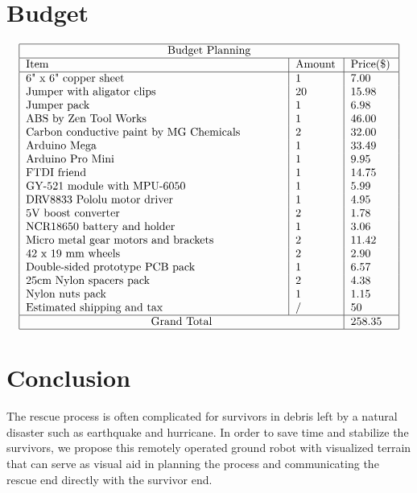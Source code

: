 \documentclass[a4paper,12pt]{article}
\begin{document}
\section{Budget}
$$
\begin{tabular}{ |p{8cm}|p{1.3cm}|p{1.3cm}|  }
	\hline
		\multicolumn{3}{|c|}{Budget Planning} \\
	\hline
		 Item & Amount & Price(\$) \\
	\hline
		 6" x 6" copper sheet					& 	1	&	7.00\\
		 Jumper with aligator clips				&	20	&	15.98\\
		 Jumper	pack								&	1	&	6.98\\
		 ABS by Zen Tool Works					&	1	&	46.00\\
		 Carbon conductive paint by MG Chemicals	&	2	&	32.00\\
		 Arduino Mega							&	1	&	33.49\\
		 Arduino Pro Mini						&	1	&	9.95\\
		 FTDI friend								&	1	&	14.75\\
		 GY-521 module with MPU-6050				&	1	&	5.99\\
		 DRV8833 Pololu motor driver				&	1	&	4.95\\
		 5V boost converter						&	2	&	1.78\\
		 NCR18650 battery and holder				&	1	&	3.06\\
		 Micro metal gear motors and brackets	&	2	&	11.42\\
		 42 x 19 mm wheels						&	2	&	2.90\\
		 Double-sided prototype PCB pack			&	1	&	6.57\\
		 25cm Nylon spacers pack					&	2	&	4.38\\
		 Nylon nuts pack							&	1	&	1.15\\
		 Estimated shipping and tax				&	/	&	50\\
	\hline
		\multicolumn{2}{|c|}{Grand Total}	& 258.35\\
	\hline
\end{tabular}
$$

\section{Conclusion}
The rescue process is often complicated for survivors in debris left by a natural disaster such as earthquake and hurricane. In order to save time and stabilize the survivors, we propose this remotely operated ground robot with visualized terrain that can serve as visual aid in planning the process and communicating the rescue end directly with the survivor end.



\medskip



\end{document}

